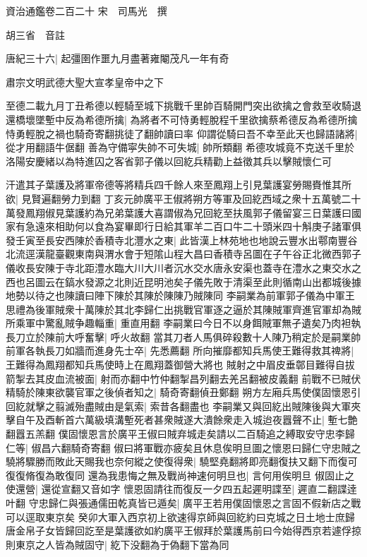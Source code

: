 資治通鑑卷二百二十
宋　司馬光　撰

胡三省　音註

唐紀三十六|{
	起彊圉作噩九月盡著雍閹茂凡一年有奇}


肅宗文明武德大聖大宣孝皇帝中之下

至德二載九月丁丑希德以輕騎至城下挑戰千里帥百騎開門突出欲擒之會救至收騎退還橋壞墜塹中反為希德所擒|{
	為將者不可恃勇輕脫程千里欲擒蔡希德反為希德所擒恃勇輕脫之禍也騎奇寄翻挑徒了翻帥讀曰率}
仰謂從騎曰吾不幸至此天也歸語諸將|{
	從才用翻語牛倨翻}
善為守備寜失帥不可失城|{
	帥所類翻}
希德攻城竟不克送千里於洛陽安慶緒以為特進囚之客省郭子儀以回紇兵精勸上益徵其兵以擊賊懷仁可

汗遣其子葉護及將軍帝德等將精兵四千餘人來至鳳翔上引見葉護宴勞賜賚惟其所欲|{
	見賢遍翻勞力到翻}
丁亥元帥廣平王俶將朔方等軍及回紇西域之衆十五萬號二十萬發鳳翔俶見葉護約為兄弟葉護大喜謂俶為兄回紇至扶風郭子儀留宴三日葉護曰國家有急遠來相助何以食為宴畢即行日給其軍羊二百口牛二十頭米四十斛庚子諸軍俱發壬寅至長安西陳於香積寺北灃水之東|{
	此皆漢上林苑地也地說云豐水出鄠南豐谷北流逕漢龍臺觀東南與渭水會于短隂山程大昌曰香積寺呂圖在子午谷正北微西郭子儀收長安陳于寺北距澧水臨大川大川者沉水交水唐永安渠也蓋寺在澧水之東交水之西也呂圖云在鎬水發源之北則近昆明池矣子儀先敗于清渠至此則循南山出都城後據地勢以待之也陳讀曰陣下陳於其陳於陳陳乃賊陳同}
李嗣業為前軍郭子儀為中軍王思禮為後軍賊衆十萬陳於其北李歸仁出挑戰官軍逐之逼於其陳賊軍齊進官軍却為賊所乘軍中驚亂賊争趣輜重|{
	重直用翻}
李嗣業曰今日不以身餌賊軍無孑遺矣乃肉袒執長刀立於陳前大呼奮擊|{
	呼火故翻}
當其刀者人馬俱碎殺數十人陳乃稍定於是嗣業帥前軍各執長刀如牆而進身先士卒|{
	先悉薦翻}
所向摧靡都知兵馬使王難得救其禆將|{
	王難得為鳳翔都知兵馬使時上在鳳翔蓋御營大將也}
賊射之中眉皮垂鄣目難得自拔箭掣去其皮血流被面|{
	射而亦翻中竹仲翻掣昌列翻去羌呂翻被皮義翻}
前戰不已賊伏精騎於陳東欲襲官軍之後偵者知之|{
	騎奇寄翻偵丑鄭翻}
朔方左廂兵馬使僕固懷恩引回紇就擊之翦滅殆盡賊由是氣索|{
	索昔各翻盡也}
李嗣業又與回紇出賊陳後與大軍夾擊自午及酉斬首六萬級填溝塹死者甚衆賊遂大潰餘衆走入城迨夜囂聲不止|{
	塹七艶翻囂五羔翻}
僕固懷恩言於廣平王俶曰賊弃城走矣請以二百騎追之縛取安守忠李歸仁等|{
	俶昌六翻騎奇寄翻}
俶曰將軍戰亦疲矣且休息俟明旦圖之懷恩曰歸仁守忠賊之驍將驟勝而敗此天賜我也奈何縱之使復得衆|{
	驍堅堯翻將即亮翻復扶又翻下而復可復復脩復為敢復同}
還為我患悔之無及戰尚神速何明旦也|{
	言何用俟明旦}
俶固止之使還營|{
	還從宣翻又音如字}
懷恩固請往而復反一夕四五起遲明諜至|{
	遲直二翻諜逹叶翻}
守忠歸仁與張通儒田乾真皆已遁矣|{
	廣平王若用僕固懷恩之言固不假新店之戰可以逕取東京矣}
癸卯大軍入西京初上欲速得京師與回紇約曰克城之日土地士庶歸唐金帛子女皆歸回訖至是葉護欲如約廣平王俶拜於葉護馬前曰今始得西京若遽俘掠則東京之人皆為賊固守|{
	紇下没翻為于偽翻下當為同}
